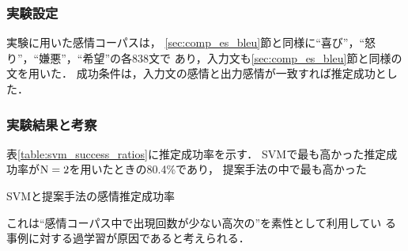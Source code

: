\documentclass[japanese]{jnlp_1.4}
\def\resp#1{}
\def\NGRAM{}
\begin{document}
\subsubsection{実験設定}

実験に用いた感情コーパスは，
\ref{sec:comp_es_bleu}節と同様に``喜び''，``怒り''，``嫌悪''，``希望''の各838文で
あり，入力文も\ref{sec:comp_es_bleu}節と同様の文を用いた．
成功条件は，入力文の感情と出力感情が一致すれば推定成功とした．
 


\subsubsection{実験結果と考察}

表\ref{table:svm_success_ratios}に推定成功率を示す．
SVMで最も高かった推定成功率が$\rm N=2$を用いたときの80.4\%であり，
提案手法の中で最も高かった\resp{成功率81.8\%と比べると1.4ポイント程度の
差になっている．このことから，発話文の感情推定において，適切な N を選択
すれば，SVMと提案手法は同程度の感情推定成功率が得られることが示された．}

\begin{table}[b]
 \caption{SVMと提案手法の感情推定成功率}
  \label{table:svm_success_ratios}

\end{table}

\resp{しかし，表{\ref{table:svm_success_ratios}}を見ると，
{${\rm N}_{max} > 2$}を用いた場合のSVMによる推定精
度が急激に減少していることがわかる．}これは``感情コーパス中で出現回数が少ない高次の\NGRAM ''を素性として利用してい
る事例に対する過学習が原因であると考えられる．
\resp{一方提案方法においては，N を増加させていってもその性能にはほとんど
差がなく，``出現回数が少ない高次{\NGRAM}''の影響をほとんど受けていないこと
がわかる．これは，RECAREの計算を相加平均で行ったことの
効果であると考えられる．}

\resp{一般に感情コーパス中の文数などによって最適な N は異なることが考え
られ，SVMの場合は，実際の応用に際し評価実験を通して最適値を探索することが
必要である．
一方RECAREであれば，十分大きな N を設定しておくことで，（計算量や
記憶容量等の問題を除けば）常に最適な推定精度を得ることが可能となる．}

\resp{更に，例えば6形態素からなるある特定の文末表現がある特定の感情に
数多く出現する，といったことがあった場合，SVMであれば，全体として
考慮すべき形態素の長さを決定する必要があるが，RECAREならば，その特定
の文末表現を利用するためだけに $\mathrm{N} = 6$と設定してしまっても，悪影響を
ほとんど及ぼさない．こうしたことから，SVMに比べてRECAREが有効である
ことが示された．}
\end{document}

